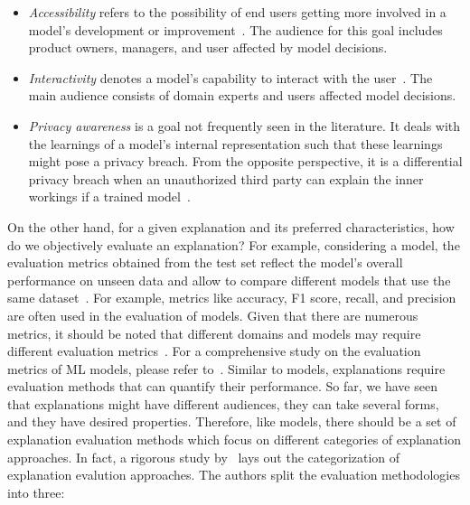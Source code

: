 \begin{itemize}
    \item \emph{Accessibility} refers to the possibility of end users getting more involved in a model's development or improvement~\parencite{XAI_BewareInmatesRunningTheAsylum_Miller}. The audience for this goal includes product owners, managers, and user affected by model decisions.
    \item \emph{Interactivity} denotes a model's capability to interact with the user~\parencite{InteractiveAndInterpretableMLModels_Kim}. The main audience consists of domain experts and users affected model decisions.
    \item \emph{Privacy awareness} is a goal not frequently seen in the literature. It deals with the learnings of a model's internal representation such that these learnings might pose a privacy breach. From the opposite perspective, it is a differential privacy breach when an unauthorized third party can explain the inner workings if a trained model~\parencite{XAIConceptsTaxonomies_Arrieta}.
\end{itemize}
On the other hand, for a given explanation and its preferred characteristics, how do we objectively evaluate an explanation? For example, considering a model, the evaluation metrics obtained from the test set reflect the model's overall performance on unseen data and allow to compare different models that use the same dataset~\parencite{PMLB_Olson}. For example, metrics like accuracy, F1 score, recall, and precision are often used in the evaluation of models. Given that there are numerous metrics, it should be noted that different domains and models may require different evaluation metrics~\parencite{BeingAccurateIsNotEnough_McNee, AReviewOnEvaluationMetrics_Hossin, PeeringIntoTheBlackBoxOfAI_Handelman}. For a comprehensive study on the evaluation metrics of ML models, please refer to~\parencite{EvaluatingLearningAlgorithms_Japkowicz}.
Similar to models, explanations require evaluation methods that can quantify their performance. So far, we have seen that explanations might have different audiences, they can take several forms, and they have desired properties. Therefore, like models, there should be a set of explanation evaluation methods which focus on different categories of explanation approaches. In fact, a rigorous study by~\cite{TowardsARigorousScienceML_Velez} lays out the categorization of explanation evalution approaches. The authors split the evaluation methodologies into three:

